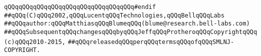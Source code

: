 \verb|qQQqqQQqqQQqqQQqqQQqqQQqqQQqqQQqqQQq#endif|\newline
\newline
\newline
\newline
\verb|##qQQq(C)qQQq2002,qQQqLucentqQQqTechnologies,qQQqBellqQQqLabs|\newline
\verb|##qQQqauthor:qQQqMatthiasqQQqBlumeqQQq(blume@research.bell-labs.com)|\newline
\verb|##qQQqSubsequentqQQqchangesqQQqbyqQQqJeffqQQqProtheroqQQqCopyrightqQQq(c)qQQq2010-2015,|\newline
\verb|##qQQqreleasedqQQqperqQQqtermsqQQqofqQQqSMLNJ-COPYRIGHT.|\newline

